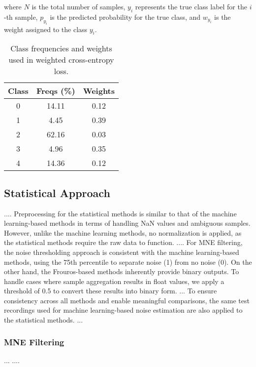 where \(N\) is the total number of samples, \(y_i\) represents the true class label for the \(i\)-th sample, \(p_{y_i}\) is the predicted probability for the true class, and \(w_{y_i}\) is the weight assigned to the class \(y_i\).

\begin{table}[h!]
    \centering
    \begin{tabular}{c|c|c}
    Class & Freqs (\%) & Weights \\
    \hline
    0 & 14.11 & 0.12 \\
    1 & 4.45  & 0.39 \\
    2 & 62.16 & 0.03 \\
    3 & 4.96  & 0.35 \\
    4 & 14.36 & 0.12 \\
    \end{tabular}
    \caption{Class frequencies and weights used in weighted cross-entropy loss.}
    \label{tab:class_freqs_weights}
\end{table}

\subsection{Statistical Approach}
....
Preprocessing for the statistical methods is similar to that of the machine learning-based methods in terms of handling NaN values and ambiguous samples. However, unlike the machine learning methods, no normalization is applied, as the statistical methods require the raw data to function.
....
For MNE filtering, the noise thresholding approach is consistent with the machine learning-based methods, using the 75th percentile to separate noise (1) from no noise (0). On the other hand, the Frouros-based methods inherently provide binary outputs. To handle cases where sample aggregation results in float values, we apply a threshold of 0.5 to convert these results into binary form.
...
To ensure consistency across all methods and enable meaningful comparisons, the same test recordings used for machine learning-based noise estimation are also applied to the statistical methods.
... 

\subsubsection{MNE Filtering}
...
....


